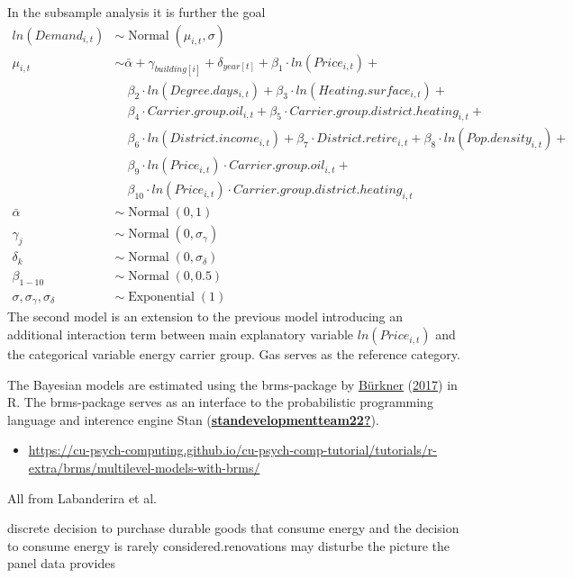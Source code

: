 \documentclass[12pt,twoside]{reedthesis}
\providecommand{\tightlist}{%
  \setlength{\itemsep}{0pt}\setlength{\parskip}{0pt}}
\begin{document}
In the subsample analysis it is further the goal
\begin{align*}
ln(Demand_{i,t}) & \sim \operatorname{Normal}(\mu_{i,t}, \sigma) \\
\mu_{i,t} & \sim \bar\alpha + \gamma_{building[i]} + \delta_{year[t]} + \beta_1 \cdot ln(Price_{i,t}) +  \\
 & \quad \beta_{2} \cdot ln(Degree.days_{i,t}) + \beta_{3} \cdot ln(Heating.surface_{i,t}) + \\
 & \quad \beta_{4} \cdot Carrier.group.oil_{i,t} + \beta_{5} \cdot Carrier.group.district.heating_{i,t} + \\
 & \quad \beta_{6} \cdot ln(District.income_{i,t}) + \beta_{7} \cdot District.retire_{i,t} + \beta_{8} \cdot ln(Pop.density_{i,t}) + \\
 & \quad \beta_{9} \cdot ln(Price_{i,t}) \cdot Carrier.group.oil_{i,t} + \\
 & \quad \beta_{10} \cdot ln(Price_{i,t}) \cdot Carrier.group.district.heating_{i,t} \\
\bar\alpha & \sim \operatorname{Normal}(0, 1) \\
\gamma_j & \sim \operatorname{Normal}(0, \sigma_{\gamma}) \\
\delta_k & \sim \operatorname{Normal}(0, \sigma_{\delta}) \\
\beta_{1-10} & \sim \operatorname{Normal}(0, 0.5) \\
\sigma, \sigma_{\gamma}, \sigma_{\delta} & \sim \operatorname{Exponential}(1)
\end{align*}
The second model is an extension to the previous model introducing an additional interaction term between main explanatory variable \(ln(Price_{i,t})\) and the categorical variable energy carrier group. Gas serves as the reference category.

The Bayesian models are estimated using the brms-package by \protect\hyperlink{ref-burkner17}{Bürkner} (\protect\hyperlink{ref-burkner17}{2017}) in R. The brms-package serves as an interface to the probabilistic programming language and interence engine Stan (\protect\hyperlink{ref-standevelopmentteam22}{\textbf{standevelopmentteam22?}}).
\begin{itemize}
\tightlist
\item
  \url{https://cu-psych-computing.github.io/cu-psych-comp-tutorial/tutorials/r-extra/brms/multilevel-models-with-brms/}
\end{itemize}
All from Labanderira et al.

discrete decision to purchase durable goods that consume energy and the decision to consume energy is rarely considered.renovations may disturbe the picture the panel data provides
\end{document}
